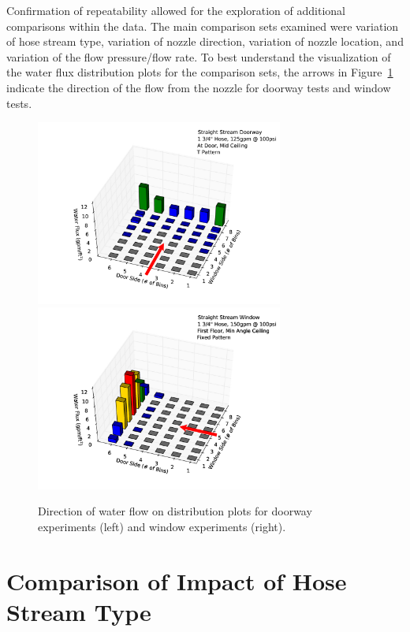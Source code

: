 \documentclass[12pt,oneside]{book}
\begin{document}
Confirmation of repeatability allowed for the exploration of additional comparisons within the data. The main comparison sets examined were variation of hose stream type, variation of nozzle direction, variation of nozzle location, and variation of the flow pressure/flow rate. To best understand the visualization of the water flux distribution plots for the comparison sets, the arrows in Figure~\ref{fig:water_flow} indicate the direction of the flow from the nozzle for doorway tests and window tests.

\begin{figure}[ht]
\includegraphics[width=3.2in]{Figures/Water_Distribution/Water_Flux_Interior}
\includegraphics[width=3.2in]{Figures/Water_Distribution/Water_Flux_Exterior}
\caption[Direction of Water Flow on Distribution Plots]{Direction of water flow on distribution plots for doorway experiments (left) and window experiments (right).}
\label{fig:water_flow}
\end{figure}


\section{Comparison of Impact of Hose Stream Type}
\label{sec:streamtype}
\end{document}
